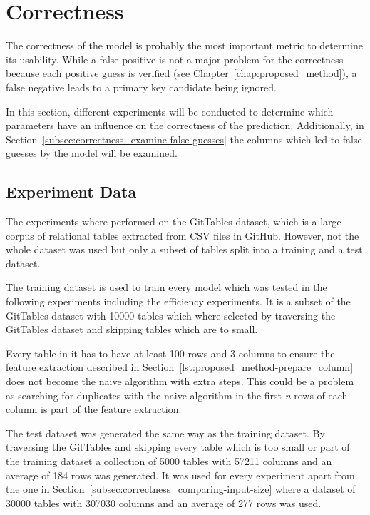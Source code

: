 \section{Correctness}\label{sec:correctness}
The correctness of the model is probably the most important metric to determine its usability. While a false positive is not a major problem for the correctness because each positive guess is verified (see Chapter~\ref{chap:proposed_method}), a false negative leads to a primary key candidate being ignored.

In this section, different experiments will be conducted to determine which parameters have an influence on the correctness of the prediction. Additionally, in Section~\ref{subsec:correctness_examine-false-guesses} the columns which led to false guesses by the model will be examined.


\subsection{Experiment Data}\label{subsec:correctness_experiment-data}
The experiments where performed on the GitTables dataset, which is a large corpus of relational tables extracted from CSV files in GitHub\cite{gittables-article}. However, not the whole dataset was used but only a subset of tables split into a training and a test dataset.

The training dataset is used to train every model which was tested in the following experiments including the efficiency experiments. It is a subset of the GitTables dataset with \num{10000} tables which where selected by traversing the GitTables dataset and skipping tables which are to small.

Every table in it has to have at least \num{100} rows and \num{3} columns to ensure the feature extraction described in Section~\ref{lst:proposed_method-prepare_column} does not become the naive algorithm with extra steps. This could be a problem as searching for duplicates with the naive algorithm in the first \textit{n} rows of each column is part of the feature extraction.

The test dataset was generated the same way as the training dataset. By traversing the GitTables and skipping every table which is too small or part of the training dataset a collection of \num{5000} tables with \num{57211} columns and an average of \num{184} rows was generated. It was used for every experiment apart from the one in Section~\ref{subsec:correctness_comparing-input-size} where a dataset of \num{30000} tables with \num{307030} columns and an average of \num{277} rows was used.


